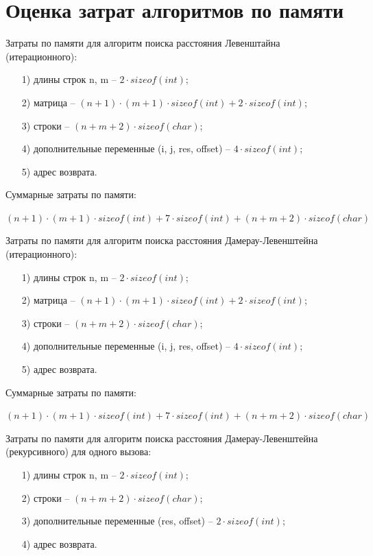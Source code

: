 \documentclass[12pt]{report}
\begin{document}
	\section{Оценка затрат алгоритмов по памяти}
	
	Затраты по памяти для алгоритм поиска расстояния Левенштайна (итерационного):

	\begin{enumerate}
	\item[1)] длины строк n, m -- $2 \cdot sizeof(int)$;
	\item[2)] матрица -- $(n + 1) \cdot (m + 1) \cdot sizeof(int) + 2 \cdot sizeof(int)$;
	\item[3)] строки -- $(n + m + 2) \cdot sizeof(char)$;
	\item[4)] дополнительные переменные (i, j, res, offset) -- $4 \cdot sizeof(int)$; 
	\item[5)] адрес возврата.
	\end{enumerate}
	
	Суммарные затраты по памяти:
	
	$(n + 1) \cdot (m + 1) \cdot sizeof(int) + 7 \cdot sizeof(int) + (n + m + 2) \cdot sizeof(char)$\newline
	
	Затраты по памяти для алгоритм поиска расстояния Дамерау-Левенштейна (итерационного):
	
	\begin{enumerate}
	\item[1)] длины строк n, m -- $2 \cdot sizeof(int)$;
	\item[2)] матрица -- $(n + 1) \cdot (m + 1) \cdot sizeof(int) + 2 \cdot sizeof(int)$;
	\item[3)] строки -- $(n + m + 2) \cdot sizeof(char)$;
	\item[4)] дополнительные переменные (i, j, res, offset) -- $4 \cdot sizeof(int)$; 
	\item[5)] адрес возврата.
	\end{enumerate}
	
	Суммарные затраты по памяти:
	
	$(n + 1) \cdot (m + 1) \cdot sizeof(int) + 7 \cdot sizeof(int) + (n + m + 2) \cdot sizeof(char)$\newline
	
	Затраты по памяти для алгоритм поиска расстояния Дамерау-Левенштейна (рекурсивного) для одного вызова:
	
	\begin{enumerate}
	\item[1)] длины строк n, m -- $2 \cdot sizeof(int)$;
	\item[2)] строки -- $(n + m + 2) \cdot sizeof(char)$;
	\item[3)] дополнительные переменные (res, offset) -- $2 \cdot sizeof(int)$; 
	\item[4)] адрес возврата.
	\end{enumerate}
	
\end{document}

